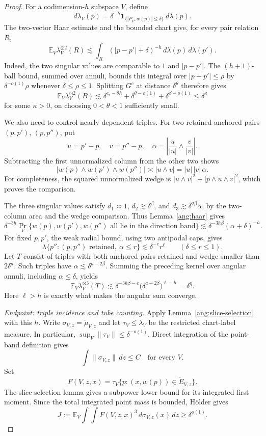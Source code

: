 \begin{proof}
For a codimension-$h$ subspace $V$, define
\[
 d\lambda_V(p)=\delta^{-h}
 \mathbf1_{\{|P_{V^\perp}w(p)|\le\delta\}}\,d\lambda(p).
\]
The two-vector Haar estimate and the bounded chart give, for every pair relation $R$,
\[
 \mathbb E_V\lambda_V^{\otimes2}(R)
 \lesssim\int_R(|p-p'|+\delta)^{-h}\,d\lambda(p)\,d\lambda(p').
\]
Indeed, the two singular values are comparable to $1$ and $|p-p'|$. The $(h+1)$-ball bound, summed over annuli, bounds this integral over $|p-p'|\le\rho$ by $\delta^{-o(1)}\rho$ whenever $\delta\le\rho\le1$. Splitting $G^c$ at distance $\delta^\theta$ therefore gives
\[
 \mathbb E_V\lambda_V^{\otimes2}(B)
 \lesssim
 \delta^{c_e-\theta h}
 +\delta^{\theta-o(1)}
 +\delta^{\beta-o(1)}
 \le\delta^\kappa
\]
for some $\kappa>0$, on choosing $0<\theta<1$ sufficiently small.

We also need to control nearly dependent triples. For two retained anchored pairs $(p,p')$, $(p,p'')$, put
\[
 u=p'-p,\quad v=p''-p,\quad
 \alpha=\left|\frac{u}{|u|}\wedge\frac{v}{|v|}\right|.
\]
Subtracting the first unnormalized column from the other two shows
\[
 |w(p)\wedge w(p')\wedge w(p'')|
 \asymp |u\wedge v|=|u|\,|v|\,\alpha.
\]
For completeness, the squared unnormalized wedge is
$|u\wedge v|^2+|p\wedge u\wedge v|^2$, which proves the comparison.

The three singular values satisfy
$d_1\asymp1$, $d_2\gtrsim\delta^\beta$, and
$d_3\gtrsim\delta^{2\beta}\alpha$, by the two-column area and the wedge comparison. Thus Lemma~\ref{ang:haar} gives
\[
 \delta^{-3h}\Pr_V\{w(p),w(p'),w(p'')
       \text{ all lie in the direction band}\}
 \lesssim\delta^{-3h\beta}(\alpha+\delta)^{-h}.
\]
For fixed $p,p'$, the weak radial bound, using two antipodal caps, gives
\[
 \lambda\{p'':(p,p'')\text{ retained},\ \alpha\le r\}
 \lesssim\delta^{-e}r^\ell
 \qquad(\delta\le r\le1).
\]
Let $T$ consist of triples with both anchored pairs retained and wedge smaller than $2\delta^a$. Such triples have
$\alpha\lesssim\delta^{a-2\beta}$. Summing the preceding kernel over angular annuli, including $\alpha\le\delta$, yields
\[
 \mathbb E_V\lambda_V^{\otimes3}(T)
 \lesssim
 \delta^{-3h\beta-e}
 \bigl(\delta^{a-2\beta}\bigr)^{\ell-h}
 =\delta^\eta.
\]
Here $\ell>h$ is exactly what makes the angular sum converge.

\emph{Endpoint: triple incidence and tube counting.}
Apply Lemma~\ref{ang:slice-selection} with this $h$. Write
$\sigma_{V,z}=\widetilde\mu_{V,z}$ and let $\tau_V\le\lambda_V$ be the restricted chart-label measure. In particular,
$\sup_V\|\tau_V\|\le\delta^{-o(1)}$.
Direct integration of the point-band definition gives
\[
 \int\|\sigma_{V,z}\|\,dz\le C
 \quad\text{for every }V.
\]
Set
\[
 F(V,z,x)=\tau_V\{p:(x,w(p))\in\widetilde E_{V,z}\}.
\]
The slice-selection lemma gives a subpower lower bound for its integrated first moment. Since the total integrated point mass is bounded, H\"older gives
\[
 J:=\mathbb E_V\int\!\int F(V,z,x)^3
                 \,d\sigma_{V,z}(x)\,dz
 \ge\delta^{o(1)}.
\]


\end{proof}
